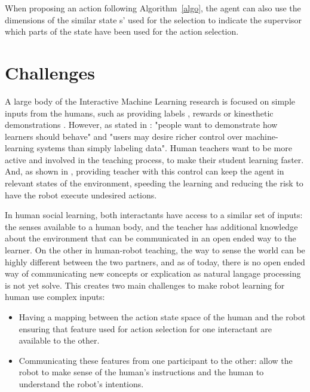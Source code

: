 \documentclass[letterpaper]{article} %
\begin{document}
When proposing an action following Algorithm~\ref{algo}, the agent can also use
the dimensions of the similar state s' used for the selection to indicate the
supervisor which parts of the state have been used for the action selection.

\section{Challenges}

A large body of the
Interactive Machine Learning research is focused on simple inputs from the
humans, such as providing labels \cite{cakmak2012designing}, rewards
\cite{knox2009interactively} or kinesthetic demonstrations
\cite{billard2008robot}. However, as stated in \cite{amershi2014power}: "people
want to demonstrate how learners should behave" and "users may desire richer
control over machine-learning systems than simply labeling data". Human teachers
want to be more active and involved in the teaching process, to make their
student learning faster. 
And, as shown in \cite{senft2017supervised}, providing teacher with this control
can keep the agent in relevant states of the environment, speeding the learning
and reducing the risk to have the robot execute undesired actions.

In human social learning, both interactants have access to a similar set of
inputs: the senses available to a human body, and the teacher has additional
knowledge about the environment that can be communicated in an open ended way to
the learner. On the other in human-robot teaching, the way to sense the world
can be highly different between the two partners, and as of today, there is no
open ended way of communicating new concepts or explication as natural langage
processing is not yet solve. This creates two main challenges to make robot
learning for human use complex inputs: 
\begin{itemize}
    \item Having a mapping between the action state space of the human and the
            robot ensuring that feature used for action selection for one
            interactant are available to the other.
    \item Communicating these features from one participant to the other: allow
        the robot to make sense of the human's instructions and the human to
        understand the robot's intentions.
\end{itemize}
\end{document}

